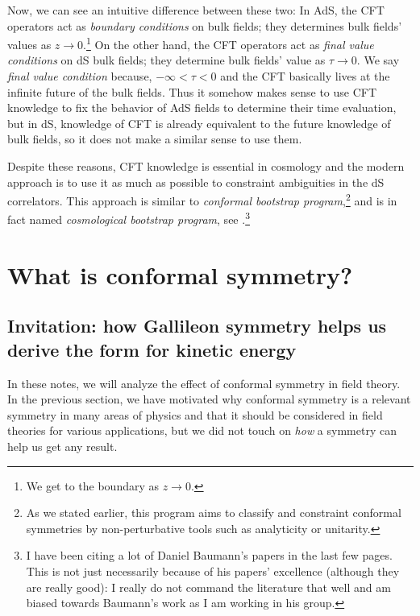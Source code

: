 \documentclass[12pt]{article}
\numberwithin{equation}{section}
\begin{document}
\begin{itemize}
Now, we can see an intuitive difference between these two: In AdS, the CFT operators act as \emph{boundary conditions} on bulk fields; they determines bulk fields' values as $z\rightarrow 0$.\footnote{We get to the boundary as $z\rightarrow 0$.} On the other hand, the CFT operators act as \emph{final value conditions} on dS bulk fields; they determine bulk fields' value as $\tau\rightarrow 0$. We say \emph{final value condition} because, $-\infty<\tau<0$ and the CFT basically lives at the infinite future of the bulk fields. Thus it somehow makes sense to use CFT knowledge to fix the behavior of AdS fields to determine their time evaluation, but in dS, knowledge of CFT is already equivalent to the future knowledge of bulk fields, so it does not make a similar sense to use them.
\end{itemize}

Despite these reasons, CFT knowledge is essential in cosmology and the modern approach is to use it as much as possible to constraint ambiguities in the dS correlators. This approach is similar to \emph{conformal bootstrap program},\footnote{As we stated earlier, this program aims to classify and constraint conformal symmetries by non-perturbative tools such as analyticity or unitarity.} and is in fact named \emph{cosmological bootstrap program}, see \cite{Baumann:2019oyu,Baumann:2020ksv,Baumann:2020dch}.\footnote{I have been citing a lot of Daniel Baumann's papers in the last few pages. This is not just necessarily because of his papers' excellence (although they are really good): I really do not command the literature that well and am biased towards Baumann's work as I am working in his group.}

\section{What is conformal symmetry?}
\subsection{Invitation:  how Gallileon symmetry helps us derive the form for kinetic energy}
In these notes, we will analyze the effect of conformal symmetry in field theory. In the previous section, we have motivated why conformal symmetry is a relevant symmetry in many areas of physics and that it should be considered in field theories for various applications, but we did not touch on \emph{how} a symmetry can help us get any result. 
\end{document}
